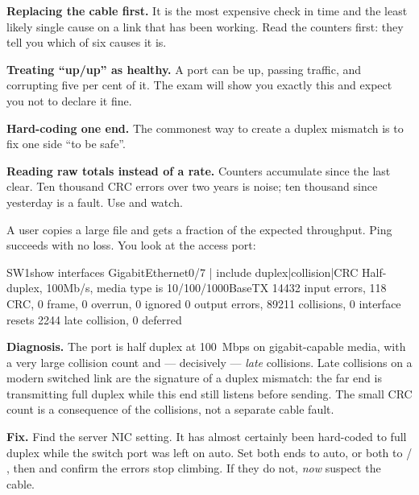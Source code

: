 \begin{pitfall}
\begin{tight}
  \item \textbf{Replacing the cable first.} It is the most expensive check in
        time and the least likely single cause on a link that has been working.
        Read the counters first: they tell you which of six causes it is.
  \item \textbf{Treating ``up/up'' as healthy.} A port can be up, passing
        traffic, and corrupting five per cent of it. The exam will show you
        exactly this and expect you not to declare it fine.
  \item \textbf{Hard-coding one end.} The commonest way to create a duplex
        mismatch is to fix one side ``to be safe''.
  \item \textbf{Reading raw totals instead of a rate.} Counters accumulate since
        the last clear. Ten thousand CRC errors over two years is noise; ten
        thousand since yesterday is a fault. Use  and watch.
\end{tight}
\end{pitfall}

\begin{breakfix}
A user copies a large file and gets a fraction of the expected throughput. Ping
succeeds with no loss. You look at the access port:

\begin{verify}{SW1}{show interfaces GigabitEthernet0/7 | include duplex|collision|CRC}
  Half-duplex, 100Mb/s, media type is 10/100/1000BaseTX
     14432 input errors, 118 CRC, 0 frame, 0 overrun, 0 ignored
     0 output errors, 89211 collisions, 0 interface resets
     2244 late collision, 0 deferred
\end{verify}

\textbf{Diagnosis.} The port is half duplex at 100~Mbps on gigabit-capable media,
with a very large collision count and --- decisively --- \emph{late} collisions.
Late collisions on a modern switched link are the signature of a duplex mismatch:
the far end is transmitting full duplex while this end still listens before
sending. The small CRC count is a consequence of the collisions, not a separate
cable fault.

\textbf{Fix.} Find the server NIC setting. It has almost certainly been hard-coded
to full duplex while the switch port was left on auto. Set both ends to auto, or
both to  / , then  and
confirm the errors stop climbing. If they do not, \emph{now} suspect the cable.
\end{breakfix}


